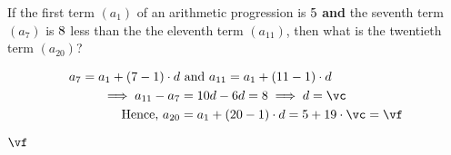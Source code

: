 


\DIVIDE{}\vc
\MULTIPLY{}\ve
\ADD\vb\ve\vf

\question[4] If the first term $(a_1)$ of an arithmetic progression is $5$ \textbf{and} 
the seventh term $(a_7)$ is $8$ less than the the eleventh term $(a_{11})$, then 
what is the twentieth term $(a_{20})$? 

\watchout

\begin{solution}[\halfpage]
  \begin{align}
    a_7 = a_1 + (7-1)\cdot d &\text{ and } a_{11} = a_1 + (11-1)\cdot d \\
    \implies a_{11}-a_7 &= 10d - 6d = \va\implies d = \vc \\
    \text{Hence, } a_{20} &= a_1 + (20-1)\cdot d = \vb + 19\cdot\vc = \vf
  \end{align}
\end{solution}

\ifprintanswers\begin{codex}$\vf$\end{codex}\fi
